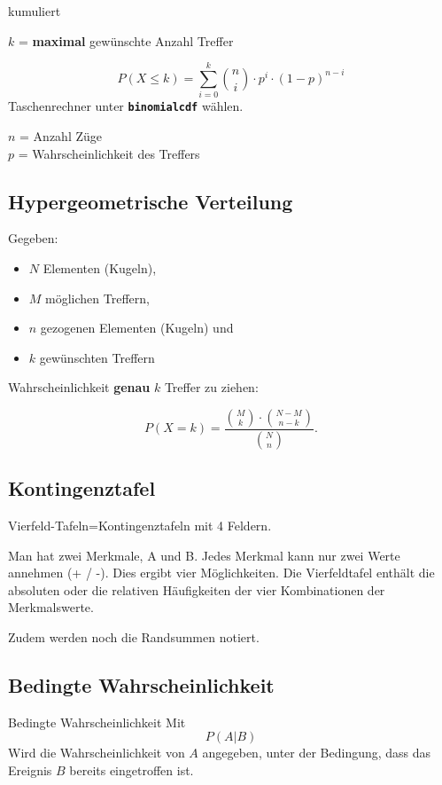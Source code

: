 \begin{multicols}{2}
\begin{gesetz}{kumuliert}{}

$k$ = \textbf{maximal} gewünschte Anzahl Treffer


$$P(X\le k) = \sum_{i=0}^{k}{n \choose i}\cdot{}p^i\cdot{}(1-p)^{n-i}$$
Taschenrechner
unter  \textbf{\texttt{binomialcdf}} wählen.

$n$ = Anzahl Züge\\
$p$ = Wahrscheinlichkeit des Treffers\\
\end{gesetz}

\forceCB
\subsection{Hypergeometrische Verteilung}
Gegeben:
\begin{itemize}
\item $N$ Elementen (Kugeln),
\item $M$ möglichen Treffern,
\item $n$ gezogenen Elementen (Kugeln) und 
\item $k$ gewünschten Treffern
\end{itemize}
Wahrscheinlichkeit \textbf{genau} $k$ Treffer zu ziehen:

$$P(X=k) = \frac{ {M \choose k} \cdot {{N-M}  \choose {n-k}} }{{N \choose n}}.$$


\subsection{Kontingenztafel}
Vierfeld-Tafeln=Kontingenztafeln mit 4 Feldern.

Man hat zwei Merkmale, A und B. Jedes Merkmal kann nur zwei Werte
annehmen (+ / -). Dies ergibt vier Möglichkeiten. Die Vierfeldtafel
enthält die absoluten oder die relativen Häufigkeiten der vier
Kombinationen der Merkmalswerte.

Zudem werden noch die Randsummen notiert.


\subsection{Bedingte Wahrscheinlichkeit}

\begin{definition}{Bedingte Wahrscheinlichkeit}{}
Mit
$$P(A|B)$$
Wird die Wahrscheinlichkeit von $A$ angegeben, unter der Bedingung,
dass das Ereignis $B$ bereits eingetroffen ist.
\end{definition}


\end{multicols}
